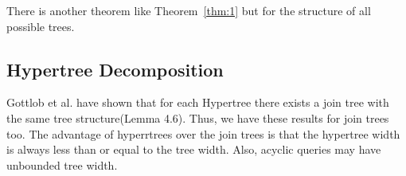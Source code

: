 \documentclass[12pt]{article}
\newtheorem{theorem}{Theorem}
\begin{document}
There is another theorem like Theorem~\ref{thm:1} but for the structure of all possible trees.
%
\subsection{Hypertree Decomposition}
Gottlob et al. have shown that for each Hypertree there exists a join tree with the same tree structure(Lemma 4.6)\cite{1}. Thus, we have these results for join trees too. The advantage of hyperrtrees over the join trees is that the hypertree width is always less than or equal to the tree width. Also, acyclic queries may have unbounded tree width\cite{1}.\\\par
\end{document}
